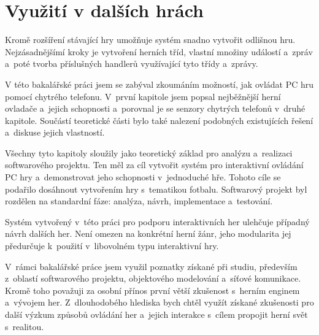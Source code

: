 \documentclass[thesis=B,czech,hidelinks]{FITthesis}[2012/06/26] %
\begin{document}
\section{Využití v dalších hrách}

Kromě rozšíření stávající hry umožňuje systém snadno vytvořit odlišnou hru. Nejzásadnějšímí kroky je vytvoření herních tříd, vlastní množiny událostí a~zpráv a~poté tvorba příslušných handlerů využívající tyto třídy a~zprávy.

\begin{conclusion}
	
V této bakalářské práci jsem se zabýval zkoumáním možností, jak ovládat PC hru pomocí chytrého telefonu. V~první kapitole jsem popsal nejběžnější herní ovladače a~jejich schopnosti a~porovnal je se senzory chytrých telefonů v~druhé kapitole. Součástí teoretické části bylo také nalezení podobných existujících řešení a~diskuse jejich vlastností.

Všechny tyto kapitoly sloužily jako teoretický základ pro analýzu a~realizaci softwarového projektu. Ten měl za cíl vytvořit systém pro interaktivní ovládání PC hry a~demonstrovat jeho schopnosti v~jednoduché hře. Tohoto cíle se podařilo dosáhnout vytvořením hry s~tematikou fotbalu. Softwarový projekt byl rozdělen na standardní fáze: analýza, návrh, implementace a~testování.

Systém vytvořený v~této práci pro podporu interaktivních her ulehčuje případný návrh dalších her. Není omezen na konkrétní herní žánr, jeho modularita jej předurčuje k~použití v~libovolném typu interaktivní hry. 

V~rámci bakalářské práce jsem využil poznatky získané při studiu, především z~oblastí softwarového projektu, objektového modelování a~síťové komunikace. Kromě toho považuji za osobní přínos první větší zkušenost s~herním enginem a~vývojem her. Z~dlouhodobého hlediska bych chtěl využít získané zkušenosti pro další výzkum způsobů ovládání her a~jejich interakce s~cílem propojit herní svět s~realitou. 
	
\end{conclusion}




\appendix

\end{document}
